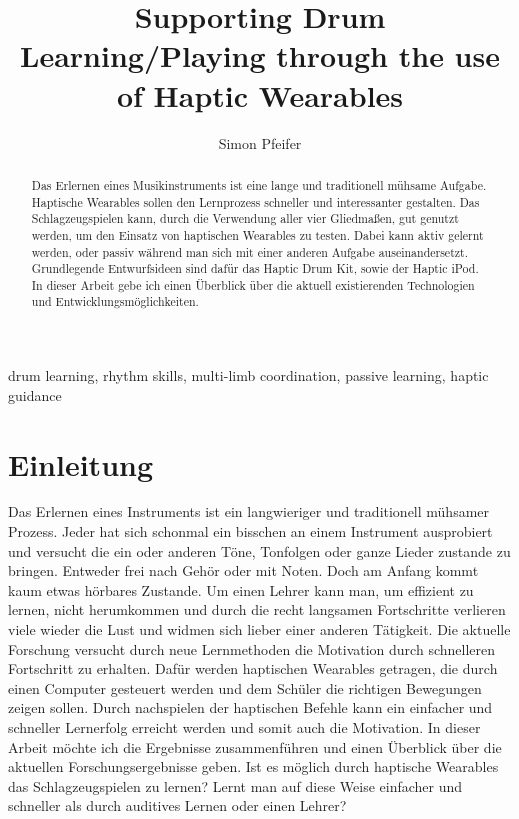 \documentclass[ngerman,runningheads,a4paper]{llncs}
\begin{document}
\title{Supporting Drum Learning/Playing through the use of Haptic Wearables}
\author{Simon Pfeifer}
\maketitle

\begin{abstract}
Das Erlernen eines Musikinstruments ist eine lange und traditionell mühsame Aufgabe.
Haptische Wearables sollen den Lernprozess schneller und interessanter gestalten.
Das Schlagzeugspielen kann, durch die Verwendung aller vier Gliedmaßen, gut genutzt werden, um den Einsatz von haptischen Wearables zu testen.
Dabei kann aktiv gelernt werden, oder passiv während man sich mit einer anderen Aufgabe auseinandersetzt.
Grundlegende Entwurfsideen sind dafür das Haptic Drum Kit, sowie der Haptic iPod.
In dieser Arbeit gebe ich einen Überblick über die aktuell existierenden Technologien und Entwicklungsmöglichkeiten.
\end{abstract}

\begin{keywords}
drum learning, rhythm skills, multi-limb coordination, passive learning, haptic guidance
\end{keywords}

\section{Einleitung}
Das Erlernen eines Instruments ist ein langwieriger und traditionell mühsamer Prozess.
Jeder hat sich schonmal ein bisschen an einem Instrument ausprobiert und versucht die ein oder anderen Töne, Tonfolgen oder ganze Lieder zustande zu bringen.
Entweder frei nach Gehör oder mit Noten. Doch am Anfang kommt kaum etwas hörbares Zustande.
Um einen Lehrer kann man, um effizient zu lernen, nicht herumkommen und durch die recht langsamen Fortschritte verlieren viele wieder die Lust und widmen sich lieber einer anderen Tätigkeit.
\newline
Die aktuelle Forschung versucht durch neue Lernmethoden die Motivation durch schnelleren Fortschritt zu erhalten.
Dafür werden haptischen Wearables getragen, die durch einen Computer gesteuert werden und dem Schüler die richtigen Bewegungen zeigen sollen.
Durch nachspielen der haptischen Befehle kann ein einfacher und schneller Lernerfolg erreicht werden und somit auch die Motivation.
\newline
In dieser Arbeit möchte ich die Ergebnisse zusammenführen und einen Überblick über die aktuellen Forschungsergebnisse geben.
Ist es möglich durch haptische Wearables das Schlagzeugspielen zu lernen?
Lernt man auf diese Weise einfacher und schneller als durch auditives Lernen oder einen Lehrer?
\end{document}
